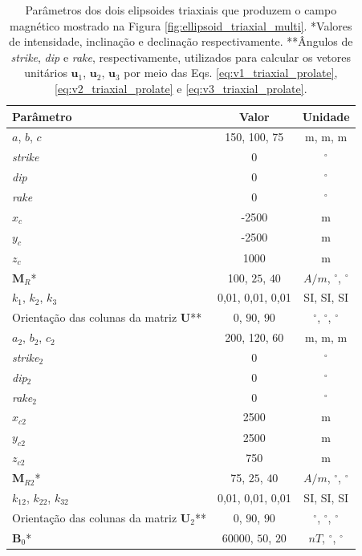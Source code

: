 \newpage

\begin{table}[h!]
	\begin{center}
		\begin{tabular}{|l|c|c|}
			\hline
			\textbf{Parâmetro}  & \textbf{Valor}  & \textbf{Unidade}\\
			\hline 
			$a$, $b$, $c$   & 150, 100, 75 & m, m, m\\
			\hline
			\textit{strike}   & $0$ & $^{\circ}$\\
			\hline
			\textit{dip}    & $0$ & $^{\circ}$\\
			\hline
			\textit{rake}   & $0$  & $^{\circ}$\\
			\hline
			$x_c$   & -2500  & m\\
			\hline          
			$y_c$   & -2500  & m\\
			\hline                
			$z_c$  & 1000  & m\\
			\hline
			$\mathbf{M}_{R}$*  & 100, $25$, $40$  & $A/m$, $^{\circ}$, $^{\circ}$\\
			\hline
			$k_1$, $k_2$, $k_3$   & 0,01, 0,01, 0,01  & SI, SI, SI\\
			\hline
			Orientação das colunas da matriz $\mathbf{U}$**   & $0$, $90$, $90$  & $^{\circ}$, $^{\circ}$, $^{\circ}$\\
			\hline 
			$a_2$, $b_2$, $c_2$   & 200, 120, 60 & m, m, m\\
			\hline
			\textit{strike}$_2$   & $0$ & $^{\circ}$\\
			\hline
			\textit{dip}$_2$    & $0$ & $^{\circ}$\\
			\hline
			\textit{rake}$_2$   & $0$  & $^{\circ}$\\
			\hline
			$x_{c2}$   & 2500  & m\\
			\hline          
			$y_{c2}$   & 2500  & m\\
			\hline                
			$z_{c2}$   & 750  & m\\
			\hline
			$\mathbf{M}_{R2}$*  & 75, $25$, $40$  & $A/m$, $^{\circ}$, $^{\circ}$\\
			\hline
			$k_12$, $k_22$, $k_32$   & 0,01, 0,01, 0,01  & SI, SI, SI\\
			\hline
			Orientação das colunas da matriz $\mathbf{U}_2$**   & $0$, $90$, $90$  & $^{\circ}$, $^{\circ}$, $^{\circ}$\\
			\hline
			$\mathbf{B}_{0}$*    & 60000, $50$, $20$ & $nT$, $^{\circ}$, $^{\circ}$\\
			\hline			
		\end{tabular}
		\caption{Parâmetros dos  dois elipsoides triaxiais que produzem o campo magnético mostrado na Figura \ref{fig:ellipsoid_triaxial_multi}. *Valores de intensidade, inclinação e declinação respectivamente. **Ângulos de \textit{strike}, \textit{dip}  e \textit{rake}, respectivamente, utilizados para calcular os vetores unitários $\mathbf{u}_{1}$, $\mathbf{u}_{2}$, $\mathbf{u}_{3}$ por meio das Eqs. \ref{eq:v1_triaxial_prolate}, \ref{eq:v2_triaxial_prolate} e \ref{eq:v3_triaxial_prolate}.}
	\end{center}
	\label{tab:ellipsoid_triaxial_multi}
\end{table}

